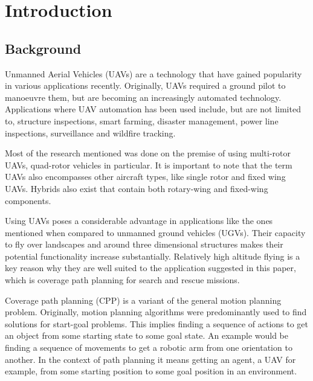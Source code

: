 \chapter{Introduction}
\label{chp:intro}


\section{Background}

Unmanned Aerial Vehicles (UAVs) are a technology that have gained popularity in various applications recently\cite{CPP-Survey-2019}. Originally, UAVs required a ground pilot to manoeuvre them, but are becoming an increasingly automated technology. Applications where UAV automation has been used include, but are not limited to, structure inspections\cite{Guerrero2013}, smart farming\cite{Lottes2017}, disaster management\cite{Maza2011}, power line inspections\cite{Chang2017}, surveillance\cite{Basilico2015} and wildfire tracking\cite{Pham2017}.

Most of the research mentioned was done on the premise of using multi-rotor UAVs, quad-rotor vehicles in particular. It is important to note that the term UAVs also encompasses other aircraft types, like single rotor and fixed wing UAVs. Hybrids also exist that contain both rotary-wing and fixed-wing components\cite{CPP-Survey-2019}.

Using UAVs poses a considerable advantage in applications like the ones mentioned when compared to unmanned ground vehicles (UGVs). Their capacity to fly over landscapes and around three dimensional structures makes their potential functionality increase substantially. Relatively high altitude flying is a key reason why they are well suited to the application suggested in this paper, which is coverage path planning for search and rescue missions.

Coverage path planning (CPP) is a variant of the general motion planning problem. Originally, motion planning algorithms were predominantly used to find solutions for start-goal problems\cite{Choset2001}. This implies finding a sequence of actions to get an object from some starting state to some goal state. An example would be finding a sequence of movements to get a robotic arm from one orientation to another. In the context of path planning it means getting an agent, a UAV for example, from some starting position to some goal position in an environment\cite{Lynch2017}.


